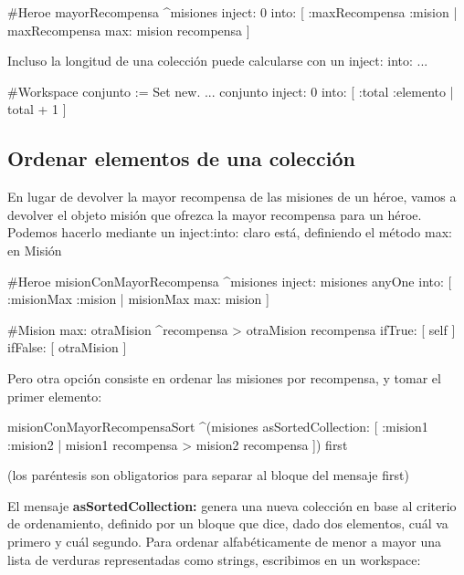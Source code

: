 \documentclass[a4paper,12pt]{book}
\begin{document}
\begin{code}
#Heroe
mayorRecompensa
   ^misiones inject: 0
             into: [ :maxRecompensa :mision | maxRecompensa max: mision recompensa ] 
\end{code}

\vspace{\baselineskip}
Incluso la longitud de una colección puede calcularse con un inject: into: ...

\begin{code}
#Workspace
conjunto := Set new.
...
conjunto inject: 0
         into: [ :total :elemento | total + 1 ] 
\end{code}


\subsection{Ordenar elementos de una colección}
En lugar de devolver la mayor recompensa de las misiones de un héroe, vamos a devolver el objeto misión que
ofrezca la mayor recompensa para un héroe. Podemos hacerlo mediante un inject:into: claro está, definiendo el
método max: en Misión

\begin{code}
#Heroe
misionConMayorRecompensa
   ^misiones inject: misiones anyOne
             into: [ :misionMax :mision | misionMax max: mision ] 
             
#Mision
max: otraMision
    ^recompensa > otraMision recompensa
          ifTrue: [ self ]
          ifFalse: [ otraMision ]
\end{code}

\vspace{\baselineskip}
Pero otra opción consiste en ordenar las misiones por recompensa, y tomar el primer elemento:

\begin{code}
misionConMayorRecompensaSort
   ^(misiones asSortedCollection: 
     [ :mision1 :mision2 | mision1 recompensa > mision2 recompensa ])
     first
\end{code}

(los paréntesis son obligatorios para separar al bloque del mensaje first)

\vspace{\baselineskip}
El mensaje \textbf{asSortedCollection:} genera una nueva colección en base al criterio de ordenamiento, definido
por un bloque que dice, dado dos elementos, cuál va primero y cuál segundo. Para ordenar alfabéticamente
de menor a mayor una lista de verduras representadas como strings, escribimos en un workspace: 
\end{document}
